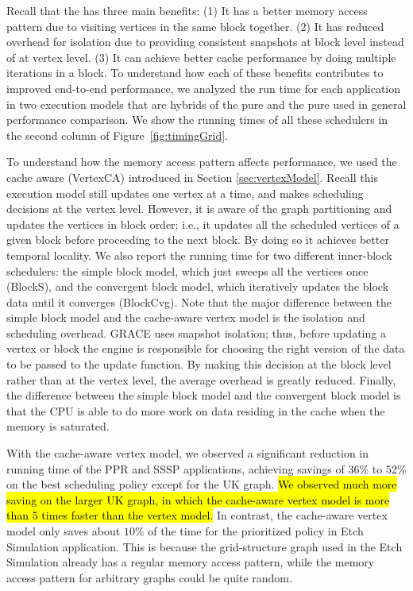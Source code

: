 Recall that the {\BlkModel} has three main benefits: (1) It has a
better memory access pattern due to visiting vertices in the same
block together. (2) It has reduced overhead for isolation due to
providing consistent snapshots at block level instead of at vertex
level. (3) It can achieve better cache performance by doing multiple
iterations in a block.  To understand how each of these benefits
contributes to improved end-to-end performance, we analyzed
the run time for each application in
two execution models
that are hybrids of the pure {\VtxModel} and the pure {\BlkModel} used
in general performance comparison.  We show the running times of all
these schedulers in
the second column of Figure~\ref{fig:timingGrid}.

To understand how the memory access pattern affects performance, we
used the cache aware {\VtxModel} (VertexCA) introduced in Section
\ref{sec:vertexModel}.  Recall this execution model still updates one
vertex at a time, and makes scheduling decisions at the vertex
level. However, it is aware of the graph partitioning and updates the
vertices in block order; i.e., it updates all the scheduled vertices
of a given block before proceeding to the next block. By doing so it
achieves better temporal locality.  We also report the running time
for two different inner-block schedulers: the simple block model,
which just sweeps all the vertices once (BlockS), and the convergent
block model, which iteratively updates the block data until it
converges (BlockCvg).  Note that the major difference between the
simple block model and the cache-aware vertex model is the isolation
and scheduling overhead.  GRACE uses snapshot isolation; thus, before
updating a vertex or block the engine is responsible for choosing the
right version of the data to be passed to the update function.  By
making this decision at the block level rather than at the vertex
level, the average overhead is greatly reduced.  Finally, the
difference between the simple block model and the convergent block
model is that the CPU is able to do more work on data residing in the
cache when the memory is saturated.

With the cache-aware vertex model, we observed a significant reduction
in running time of the PPR and SSSP applications, achieving savings of
$36\%$ to $52\%$ on the best scheduling policy except for the UK graph. 
\hl{We observed much more saving on the larger UK graph, in which the
cache-aware vertex model is more than 5 times faster than the vertex model. }
In contrast, the cache-aware vertex model only saves about $10\%$ of the time for the
prioritized policy in Etch Simulation application. This is because the
grid-structure graph used in the Etch Simulation already has a regular
memory access pattern, while the memory access pattern for arbitrary
graphs could be quite random.

